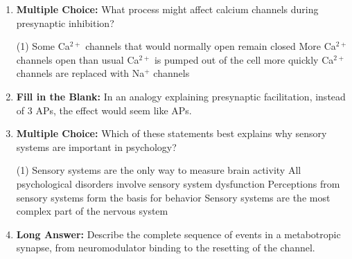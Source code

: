 \begin{enumerate}[label=\textbf{Q2.8.\arabic*}]
      \item \textbf{Multiple Choice:} What process might affect calcium channels during presynaptic inhibition?
            \begin{tasks}[label=\textcolor{\documentTheme}{(\Alph*)}, item-format=\color{\documentTheme}, label-width=1.5em, item-indent=1.7em](1)
                  \task Some Ca\(^{2+}\) channels that would normally open remain closed
                  \task More Ca\(^{2+}\) channels open than usual
                  \task Ca\(^{2+}\) is pumped out of the cell more quickly
                  \task Ca\(^{2+}\) channels are replaced with Na\(^{+}\) channels
            \end{tasks}
            
      \item \textbf{Fill in the Blank:} In an analogy explaining presynaptic facilitation, instead of 3 APs, the effect would seem like \underline{\hspace{3cm}} APs. \\

      \item \textbf{Multiple Choice:} Which of these statements best explains why sensory systems are important in psychology?
            \begin{tasks}[label=\textcolor{\documentTheme}{(\Alph*)}, item-format=\color{\documentTheme}, label-width=1.5em, item-indent=1.7em](1)
                  \task Sensory systems are the only way to measure brain activity
                  \task All psychological disorders involve sensory system dysfunction
                  \task Perceptions from sensory systems form the basis for behavior
                  \task Sensory systems are the most complex part of the nervous system
            \end{tasks}
            
      \item \textbf{Long Answer:} Describe the complete sequence of events in a metabotropic synapse, from neuromodulator binding to the resetting of the channel. \\[1in]
\end{enumerate}

